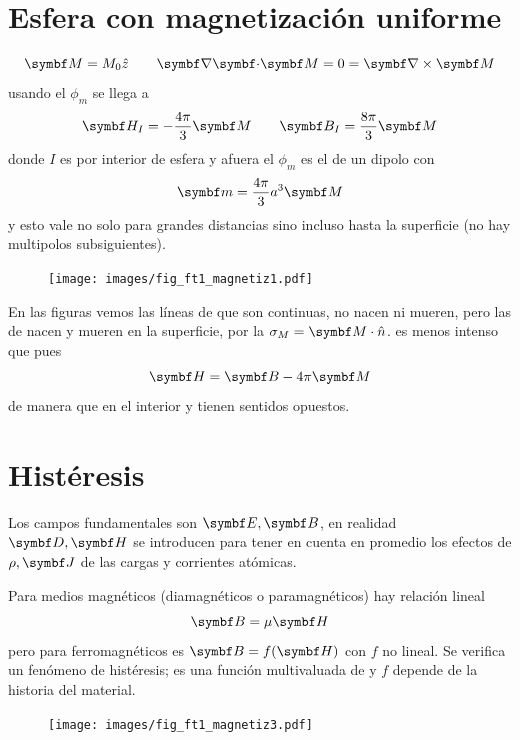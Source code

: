 \documentclass[10pt,oneside]{CBFT_book}
\begin{document}
\section{Esfera con magnetización uniforme}
\[
	\vb{M} = M_0 \hat{z} \qquad \divem{M}= 0 = \rotorm{M}
\]
usando el $\phi_m$ se llega a
\[
	\vb{H}_I = -\frac{4\pi}{3}\vb{M} \qquad \vb{B}_I = \frac{8\pi}{3}\vb{M}
\]
donde $I$ es por interior de esfera y afuera el $\phi_m$ es el de un dipolo con 
\[
	\vb{m} = \frac{4\pi}{3}a^3\vb{M}
\]
y esto vale no solo para grandes distancias sino incluso hasta la superficie (no hay multipolos
subsiguientes).

\begin{figure}[htb]
	\begin{center}
	\texttt{[image: images/fig\_ft1\_magnetiz1.pdf]}	 
	\end{center}
	\caption{}
\end{figure} 

En las figuras vemos las líneas de  que son continuas, no nacen ni mueren, pero las
de  nacen y mueren en la superficie, por la $\sigma_M = \vb{M}\cdot\hat{n}$.
 es menos intenso que  pues
\[
	\vb{H} = \vb{B} - 4\pi \vb{M}
\]
de manera que en el interior  y  tienen sentidos opuestos.

\section{Histéresis}

Los campos fundamentales son $\vb{E},\vb{B}$, en realidad $\vb{D},\vb{H}$ se introducen para tener
en cuenta en promedio los efectos de $\rho, \vb{J}$ de las cargas y corrientes atómicas.

Para medios magnéticos (diamagnéticos o paramagnéticos) hay relación lineal
\[
	\vb{B} = \mu \vb{H}
\]
pero para ferromagnéticos es $\vb{B} = f(\vb{H})$ con $f$ no lineal. Se verifica un fenómeno
de histéresis;  es una función multivaluada de  y $f$ depende de la historia del material.

\begin{figure}[htb]
	\begin{center}
	\texttt{[image: images/fig\_ft1\_magnetiz3.pdf]}	 
	\end{center}
	\caption{}
\end{figure} 
\end{document}
